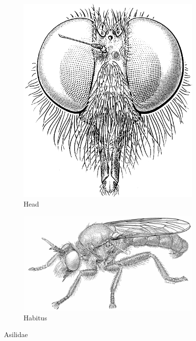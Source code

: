 \documentclass[letterpaper, 11pt]{article}
\begin{document}
\begin{figure}[ht!]
    \centering
    \begin{subfigure}[ht!]{0.25\textwidth}
        \includegraphics[width=\textwidth]{AsilidHead}
        \caption{Head \citep[][Fig. 42.35]{mcalpine1981manual}}
        \label{fig:asilid2}
    \end{subfigure}
    \qquad 
    \begin{subfigure}[ht!]{0.45\textwidth}
        \includegraphics[width=\textwidth]{AsilidHabitus}
        \caption{Habitus \citep[][Fig. 42.1]{mcalpine1981manual}}
        \label{fig:asilid1}
    \end{subfigure}
    \caption{Asilidae}\label{fig:asilids}
\end{figure}
\end{document}
